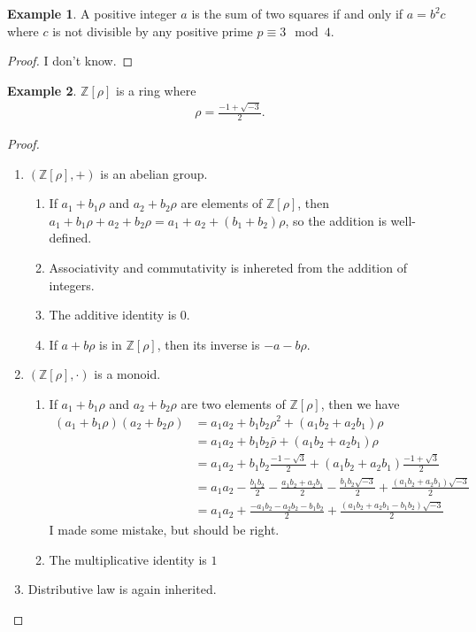 \documentclass[a4paper]{book}
\theoremstyle{definition}
\newtheorem{example}{Example}[definition]
\begin{document}
\begin{example}
    A positive integer \(a\) is the sum of two squares if and only if \(a = b^2 c\) where \(c\) is not divisible by any positive prime \(p \equiv 3 \mod{4}\).
\end{example}
\begin{proof}
    I don't know.
\end{proof}

\begin{example}
    \(\mathbb{Z}[\rho]\) is a ring where
    \begin{align*}
        \rho = \frac{-1 + \sqrt{-3}}{2} \text{.}
    \end{align*}
\end{example}
\begin{proof}
    \begin{enumerate}
        \item \((\mathbb{Z}[\rho], +)\) is an abelian group.
        \begin{enumerate}
            \item If \(a_1 + b_1 \rho\) and \(a_2 + b_2 \rho\) are elements of \(\mathbb{Z}[\rho]\), then \(a_1 + b_1 \rho + a_2 + b_2 \rho = a_1 + a_2 + (b_1 + b_2) \rho\), so the addition is well-defined.
            \item Associativity and commutativity is inhereted from the addition of integers.
            \item The additive identity is \(0\).
            \item If \(a + b \rho\) is in \(\mathbb{Z}[\rho]\), then its inverse is \(-a - b \rho\).
        \end{enumerate}
        \item \((\mathbb{Z}[\rho], \cdot)\) is a monoid.
        \begin{enumerate}
            \item If \(a_1 + b_1 \rho\) and \(a_2 + b_2 \rho\) are two elements of \(\mathbb{Z}[\rho]\), then we have
            \begin{align*}
                (a_1 + b_1 \rho)(a_2 + b_2 \rho) &= a_1 a_2 + b_1 b_2 \rho^2 + (a_1 b_2 + a_2 b_1) \rho \\
                &= a_1 a_2 + b_1 b_2 \overline{\rho} + (a_1 b_2 + a_2 b_1) \rho \\
                &= a_1 a_2 + b_1 b_2 \frac{-1 - \sqrt{3}}{2} + (a_1 b_2 + a_2 b_1) \frac{-1 + \sqrt{3}}{2} \\
                &= a_1 a_2 - \frac{b_1 b_2}{2} - \frac{a_1 b_2 + a_2 b_1}{2} - \frac{b_1 b_2 \sqrt{-3}}{2} + \frac{(a_1 b_2 + a_2 b_1) \sqrt{-3}}{2} \\
                &= a_1 a_2 + \frac{-a_1 b_2 - a_2 b_2 -b_1 b_2}{2} + \frac{(a_1 b_2 + a_2 b_1 - b_1 b_2) \sqrt{-3}}{2}
            \end{align*}
            I made some mistake, but should be right.
            \item The multiplicative identity is \(1\)
        \end{enumerate}
        \item Distributive law is again inherited.
    \end{enumerate}
\end{proof}
\end{document}
